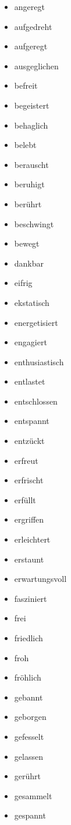 \begin{multicols}{2}
  \begin{itemize}
    \item angeregt
    \item aufgedreht
    \item aufgeregt
    \item ausgeglichen
    \item befreit
    \item begeistert
    \item behaglich
    \item belebt
    \item berauscht
    \item beruhigt
    \item berührt
    \item beschwingt
    \item bewegt
    \item dankbar
    \item eifrig
    \item ekstatisch
    \item energetisiert
    \item engagiert
    \item enthusiastisch
    \item entlastet
    \item entschlossen
    \item entspannt
    \item entzückt
    \item erfreut
    \item erfrischt
    \item erfüllt
    \item ergriffen
    \item erleichtert
    \item erstaunt
    \item erwartungsvoll
    \item fasziniert
    \item frei
    \item friedlich
    \item froh
    \item fröhlich
    \item gebannt
    \item geborgen
    \item gefesselt
    \item gelassen
    \item gerührt
    \item gesammelt
    \item gespannt

\end{itemize}
\end{multicols}
